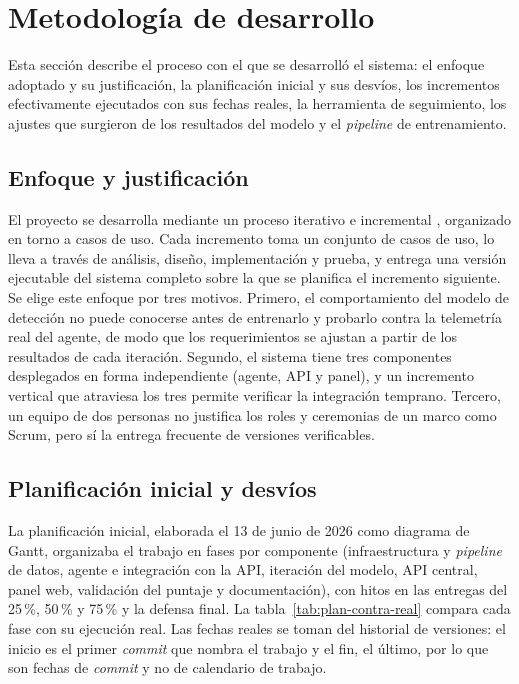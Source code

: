 \chapter{Metodología de desarrollo}\label{chap:metodologia}
\label{sec:metodologia}

Esta sección describe el proceso con el que se desarrolló el sistema: el enfoque adoptado y su justificación, la planificación inicial y sus desvíos, los incrementos efectivamente ejecutados con sus fechas reales, la herramienta de seguimiento, los ajustes que surgieron de los resultados del modelo y el \emph{pipeline} de entrenamiento.

\section{Enfoque y justificación}
El proyecto se desarrolla mediante un proceso iterativo e incremental \parencite{Larman2003},
organizado en torno a casos de uso. Cada incremento toma un conjunto de casos de uso, lo lleva a través de
análisis, diseño, implementación y prueba, y entrega una versión ejecutable del sistema completo
sobre la que se planifica el incremento siguiente. Se elige este enfoque por tres motivos. Primero,
el comportamiento del modelo de detección no puede conocerse antes de entrenarlo y probarlo
contra la telemetría real del agente, de modo que los requerimientos se ajustan a partir de los
resultados de cada iteración. Segundo, el sistema tiene tres componentes desplegados en forma
independiente (agente, API y panel), y un incremento vertical que atraviesa los tres permite
verificar la integración temprano. Tercero, un equipo de dos personas no justifica los roles y
ceremonias de un marco como Scrum, pero sí la entrega frecuente de versiones verificables.

\section{Planificación inicial y desvíos}
\label{sec:plan-contra-real}
La planificación inicial, elaborada el 13 de junio de 2026 como diagrama de Gantt, organizaba el trabajo en fases por componente (infraestructura y \emph{pipeline} de datos, agente e integración con la API, iteración del modelo, API central, panel web, validación del puntaje y documentación), con hitos en las entregas del 25\,\%, 50\,\% y 75\,\% y la defensa final. La tabla~\ref{tab:plan-contra-real} compara cada fase con su ejecución real. Las fechas reales se toman del historial de versiones: el inicio es el primer \emph{commit} que nombra el trabajo y el fin, el último, por lo que son fechas de \emph{commit} y no de calendario de trabajo.

